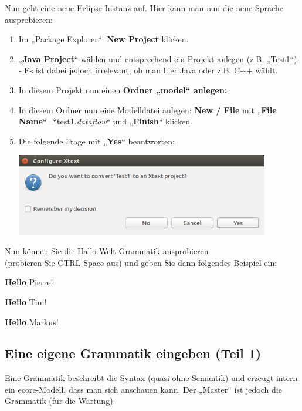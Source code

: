 \documentclass[a4]{article}
\begin{document}
Nun geht eine neue Eclipse-Instanz auf. Hier kann man nun die neue
Sprache ausprobieren:

\begin{enumerate}
\def\labelenumi{\arabic{enumi}.}
\item
  Im „Package Explorer``: \textbf{New Project} klicken.
\item
  „\textbf{Java Project}`` wählen und entsprechend ein Projekt anlegen
  (z.B. „Test1``) - Es ist dabei jedoch irrelevant, ob man hier Java
  oder z.B. C++ wählt.
\item
  In diesem Projekt nun einen \textbf{Ordner „model`` anlegen:\\
   }
\item
  In diesem Ordner nun eine Modelldatei anlegen: \textbf{New / File} mit
  „\textbf{File Name}``=``test1.\emph{dataflow}`` und „\textbf{Finish}``
  klicken.
\item
  Die folgende Frage mit „\textbf{Yes}`` beantworten:

  \includegraphics[width=4.36890in,height=1.40830in]{./Pictures/1000020100000263000000C5AC8B604E35219E41.png}
\end{enumerate}

Nun
können Sie die Hallo Welt Grammatik ausprobieren\\
(probieren Sie CTRL-Space aus) und geben Sie dann folgendes Beispiel
ein:

\textbf{Hello} Pierre!

\textbf{Hello} Tim!

\textbf{Hello} Markus!

\subsection[Eine eigene Grammatik eingeben (Teil
1)]{\texorpdfstring{\protect\hypertarget{anchor-20}{}{}Eine eigene
Grammatik eingeben (Teil
1)}{Eine eigene Grammatik eingeben (Teil 1)}}\label{eine-eigene-grammatik-eingeben-teil-1}

Eine Grammatik beschreibt die Syntax (quasi ohne Semantik) und erzeugt
intern ein ecore-Modell, dass man sich anschauen kann. Der „Master`` ist
jedoch die Grammatik (für die Wartung).
\end{document}
